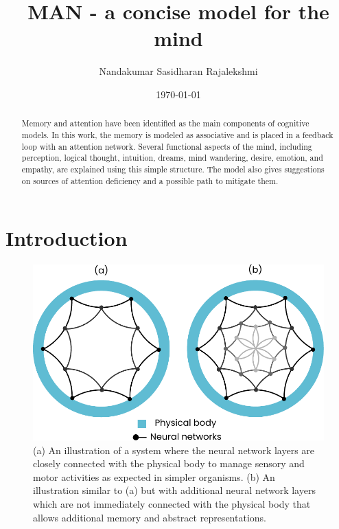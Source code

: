 \documentclass[reprint,amsmath,amssymb,apr,aip,onecolumn, 11pt]{revtex4-1}
\begin{document}
	
	\title{MAN - a concise model for the mind}
	
	\author{Nandakumar Sasidharan Rajalekshmi}
	

	
	
	\date{\today}
	\begin{abstract}
	Memory and attention have been identified as the main components of cognitive models. In this work, the memory is modeled as associative and is placed in a feedback loop with an attention network. Several functional aspects of the mind, including perception, logical thought, intuition, dreams, mind wandering, desire, emotion, and empathy, are explained using this simple structure. The model also gives suggestions on sources of attention deficiency and a possible path to mitigate them.
		
	\end{abstract}
	
	\maketitle
	\section{Introduction}
	
	
	
	\begin{figure}[h!]
		\centerline{\includegraphics[width=0.65\linewidth]{figures/figure_man_animal_brain.pdf}}
		\caption{(a) An illustration of a system where the neural network layers are closely connected with the physical body to manage sensory and motor activities as expected in simpler organisms. (b) An illustration similar to (a) but with additional neural network layers which are not immediately connected with the physical body that allows additional memory and abstract representations. }
		\label{fig:man_animal}
	\end{figure}
	
\end{document}
